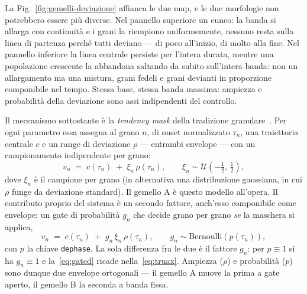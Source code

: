     

La Fig.~\ref{fig:gemelli-deviazione} affianca le due map, e le due
morfologie non potrebbero essere più diverse. Nel pannello superiore un
cuneo: la banda si allarga con continuità e i grani la riempiono
uniformemente, nessuno resta sulla linea di partenza perché tutti deviano
--- di poco all'inizio, di molto alla fine. Nel pannello inferiore la
linea centrale persiste per l'intera durata, mentre una popolazione
crescente la abbandona saltando da subito sull'intera banda: non un
allargamento ma una mistura, grani fedeli e grani devianti in proporzione
componibile nel tempo. Stessa base, stessa banda massima: ampiezza e
probabilità della deviazione sono assi indipendenti del controllo.

Il meccanismo sottostante è la \emph{tendency mask} della tradizione
granulare~\cite{Truax1988}. Per ogni parametro essa assegna al grano $n$,
di onset normalizzato $\tau_n$, una traiettoria centrale $c$ e un range di
deviazione $\rho$ --- entrambi envelope --- con un campionamento
indipendente per grano:
\begin{equation}
  v_n \;=\; c(\tau_n) \;+\; \xi_n\,\rho(\tau_n),
  \qquad \xi_n \sim \mathcal{U}\!\left(-\tfrac{1}{2},\,\tfrac{1}{2}\right),
  \label{eq:truax}
\end{equation}
dove $\xi_n$ è il campione per grano (in alternativa una distribuzione
gaussiana, in cui $\rho$ funge da deviazione standard). Il gemello A è
questo modello all'opera. Il contributo proprio del sistema è un secondo
fattore, anch'esso componibile come envelope: un gate di probabilità $g_n$
che decide grano per grano \emph{se} la maschera si applica,
\begin{equation}
  v_n \;=\; c(\tau_n) \;+\; g_n\,\xi_n\,\rho(\tau_n),
  \qquad g_n \sim \mathrm{Bernoulli}\!\left(p(\tau_n)\right),
  \label{eq:gated}
\end{equation}
con $p$ la chiave \texttt{dephase}. La sola differenza fra le due è il
fattore $g_n$: per $p\equiv 1$ si ha $g_n\equiv 1$ e la~\eqref{eq:gated}
ricade nella~\eqref{eq:truax}. Ampiezza ($\rho$) e probabilità ($p$) sono
dunque due envelope ortogonali --- il gemello A muove la prima a gate
aperto, il gemello B la seconda a banda fissa.

